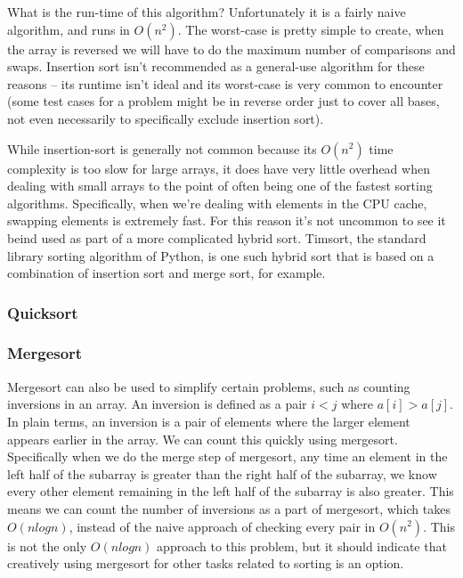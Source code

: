 
What is the run-time of this algorithm? Unfortunately it is a fairly naive algorithm, and runs in $O(n^2)$. The worst-case is pretty simple to create, when the array is reversed we will have to do the maximum number of comparisons and swaps. Insertion sort isn't recommended as a general-use algorithm for these reasons -- its runtime isn't ideal and its worst-case is very common to encounter (some test cases for a problem might be in reverse order just to cover all bases, not even necessarily to specifically exclude insertion sort).

While insertion-sort is generally not common because its $O(n^2)$ time complexity is too slow for large arrays, it does have very little overhead when dealing with small arrays to the point of often being one of the fastest sorting algorithms. Specifically, when we're dealing with elements in the CPU cache, swapping elements is extremely fast. For this reason it's not uncommon to see it beind used as part of a more complicated hybrid sort. Timsort, the standard library sorting algorithm of Python, is one such hybrid sort that is based on a combination of insertion sort and merge sort, for example.

\subsubsection{Quicksort}

\subsubsection{Mergesort}

Mergesort can also be used to simplify certain problems, such as counting inversions in an array. An inversion is defined as a pair $i < j$ where $a[i] > a[j]$. In plain terms, an inversion is a pair of elements where the larger element appears earlier in the array. We can count this quickly using mergesort. Specifically when we do the merge step of mergesort, any time an element in the left half of the subarray is greater than the right half of the subarray, we know every other element remaining in the left half of the subarray is also greater. This means we can count the number of inversions as a part of mergesort, which takes $O(n log n)$, instead of the naive approach of checking every pair in $O(n^2)$. This is not the only $O(n log n)$ approach to this problem, but it should indicate that creatively using mergesort for other tasks related to sorting is an option.

